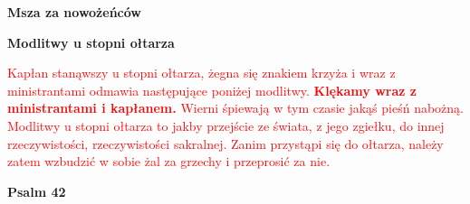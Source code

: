 \begin{center}
\Large

\textbf{Msza za nowożeńców}\\[0.3cm] 

\normalsize
\end{center}

\begin{center}
\large
\textbf{Modlitwy u stopni ołtarza}
\normalsize

\textcolor{red}{Kapłan stanąwszy u stopni ołtarza, żegna się znakiem krzyża i wraz z ministrantami odmawia następujące poniżej modlitwy. \textbf{Klękamy wraz z ministrantami i kapłanem.} Wierni śpiewają w tym czasie jakąś pieśń nabożną. Modlitwy u stopni ołtarza to jakby przejście ze świata, z jego zgiełku, do innej rzeczywistości, rzeczywistości sakralnej. Zanim przystąpi się do ołtarza, należy zatem wzbudzić w sobie żal za grzechy i przeprosić za nie.}

\textbf{Psalm 42}
\end{center}


